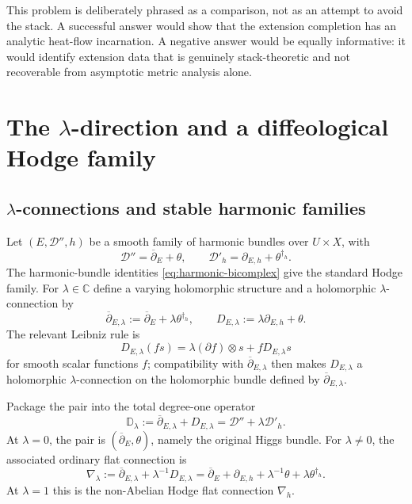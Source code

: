 \documentclass[11pt,reqno]{amsart}
\theoremstyle{definition}
\theoremstyle{remark}
\newcommand{\C}{\mathbb C}
\newcommand{\cD}{\mathcal D}
\newcommand{\ddbar}{\overline\partial}
\begin{document}
This problem is deliberately phrased as a comparison, not as an attempt to avoid the stack.  A successful answer would show that the extension completion has an analytic heat-flow incarnation.  A negative answer would be equally informative: it would identify extension data that is genuinely stack-theoretic and not recoverable from asymptotic metric analysis alone.

\section{The \texorpdfstring{$\lambda$}{lambda}-direction and a diffeological Hodge family}\label{sec:lambda}

\subsection{\texorpdfstring{$\lambda$}{lambda}-connections and stable harmonic families}

Let $(E,\cD'',h)$ be a smooth family of harmonic bundles over $U\times X$, with
\[
  \cD''=\ddbar_E+\theta,
  \qquad
  \cD'_h=\partial_{E,h}+\theta^{\dagger_h}.
\]
The harmonic-bundle identities \eqref{eq:harmonic-bicomplex} give the standard Hodge family.  For $\lambda\in\C$ define a varying holomorphic structure and a holomorphic $\lambda$-connection by
\begin{equation}\label{eq:lambda-connection}
  \ddbar_{E,\lambda}
  :=\ddbar_E+\lambda\theta^{\dagger_h},
  \qquad
  D_{E,\lambda}
  :=\lambda\partial_{E,h}+\theta.
\end{equation}
The relevant Leibniz rule is
\[
  D_{E,\lambda}(fs)
  =\lambda(\partial f)\otimes s+fD_{E,\lambda}s
\]
for smooth scalar functions $f$; compatibility with $\ddbar_{E,\lambda}$ then makes $D_{E,\lambda}$ a holomorphic $\lambda$-connection on the holomorphic bundle defined by $\ddbar_{E,\lambda}$.

Package the pair into the total degree-one operator
\begin{equation}\label{eq:lambda-total-differential}
  \mathbb D_\lambda
  :=\ddbar_{E,\lambda}+D_{E,\lambda}
  =\cD''+\lambda\cD'_h.
\end{equation}
At $\lambda=0$, the pair is $(\ddbar_E,\theta)$, namely the original Higgs bundle.  For $\lambda\ne0$, the associated ordinary flat connection is
\begin{equation}\label{eq:lambda-flat-rescaled}
  \nabla_\lambda
  :=\ddbar_{E,\lambda}+\lambda^{-1}D_{E,\lambda}
  =\ddbar_E+\partial_{E,h}
   +\lambda^{-1}\theta+\lambda\theta^{\dagger_h}.
\end{equation}
At $\lambda=1$ this is the non-Abelian Hodge flat connection $\nabla_h$.
\end{document}
